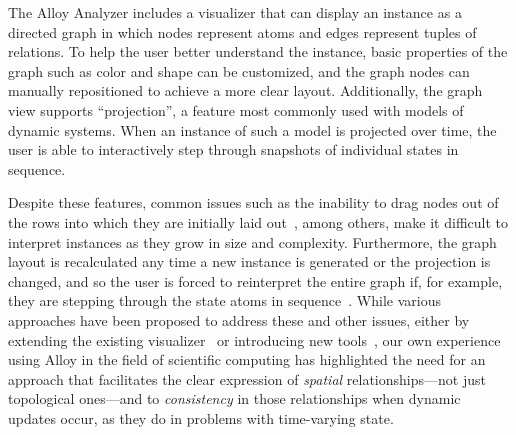 \documentclass[runningheads]{llncs}
\begin{document}
The Alloy Analyzer includes a visualizer that can display an instance as a directed graph in which nodes represent atoms and edges represent tuples of relations.
To help the user better understand the instance, basic properties of the graph such as color and shape can be customized, and the graph nodes can manually repositioned to achieve a more clear layout.
Additionally, the graph view supports ``projection'', a feature most commonly used with models of dynamic systems. 
When an instance of such a model is projected over time, the user is able to interactively step through snapshots of individual states in sequence.

Despite these features, common issues such as the inability to drag nodes out of the rows into which they are initially laid out~\cite{couto2018,macedo2019}, among others, make it difficult to interpret instances as they grow in size and complexity.
Furthermore, the graph layout is recalculated any time a new instance is generated or the projection is changed, and so the user is forced to reinterpret the entire graph if, for example, they are stepping through the state atoms in sequence~\cite{couto2018,misue1995,zaman2013}.
While various approaches have been proposed to address these and other issues, either by extending the existing visualizer~\cite{zaman2013} or introducing new tools~\cite{couto2018,macedo2019,gammaitoni2014}, our own experience using Alloy in the field of scientific computing has highlighted the need for an approach that facilitates the clear expression of \emph{spatial} relationships---not just topological ones---and to \emph{consistency} in those relationships when dynamic updates occur, as they do in problems with time-varying state.


\end{document}
